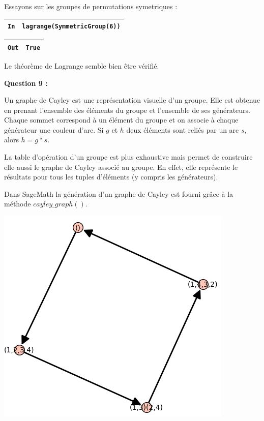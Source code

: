 \documentclass[titlepage]{article}
\begin{document}
    Essayons sur les groupes de permutations symetriques : 

    \begin{tabularx}{11.5cm}{|p{0.60cm}|X|}
        \hline
        \verb|In|
        & 
        \verb|lagrange(SymmetricGroup(6))|
        \\
        \hline
    \end{tabularx}\newline
    \begin{tabularx}{11.5cm}{|p{0.60cm}|X|}
        \hline
        \verb|Out|
        & 
        \verb|True|
        \\
        \hline
    \end{tabularx}\newline

    Le théorème de Lagrange semble bien être vérifié.
    \newline

    \textbf{Question 9 :}

    Un graphe de Cayley est une représentation visuelle d'un groupe. Elle est obtenue en prenant l'ensemble des éléments du groupe et l'ensemble de ses générateurs.
    Chaque sommet correspond à un élément du groupe et on associe à chaque générateur une couleur d'arc. Si $g$ et $h$ deux éléments sont reliés par un arc $s$, alors $h = g*s$.

    La table d'opération d'un groupe est plus exhaustive mais permet de construire elle aussi le graphe de Cayley associé au groupe.
    En effet, elle représente le résultats pour tous les tuples d'éléments (y compris les générateurs).

    Dans SageMath la génération d'un graphe de Cayley est fourni grâce à la méthode $cayley\_graph()$.

    \begin{center}
        \includegraphics[scale=0.5]{q91.png}
    \end{center}
\end{document}
